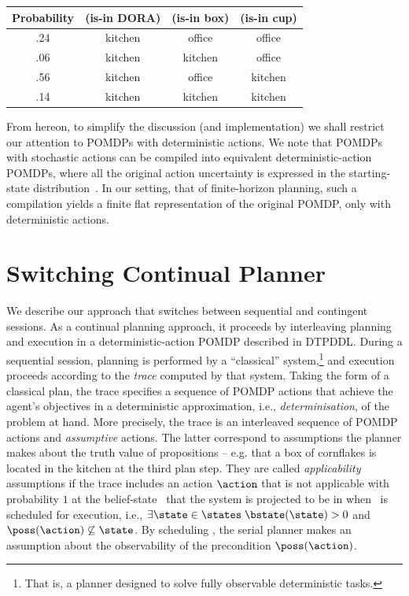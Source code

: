 \documentclass{article}
\begin{document}
\small
\begin{tabular}{cccc}
\hline
Probability & (is-in DORA)  & (is-in box)  & (is-in cup) \\
\hline
.24 & kitchen & office & office \\
.06 & kitchen & kitchen & office \\
.56 & kitchen & office & kitchen \\
.14 & kitchen & kitchen & kitchen \\
\hline
\end{tabular}
\normalsize

From hereon, to simplify the discussion (and implementation)
we shall restrict our attention to POMDPs with deterministic
actions. We note that POMDPs with stochastic
actions can be compiled into equivalent deterministic-action POMDPs,
where all the original action uncertainty is expressed in the
starting-state distribution~\cite{ng:Jordan:2000}. In our setting,
that of finite-horizon planning, such a compilation yields a finite
flat representation of the original POMDP, only with deterministic
actions.



\section{Switching Continual Planner}


We describe our approach that switches between sequential and
contingent sessions. As a continual planning approach, it proceeds by
interleaving planning and execution in a deterministic-action POMDP
described in DTPDDL. During a sequential session, planning is
performed by a ``classical'' system,\footnote{That is, a planner
designed to solve fully observable deterministic tasks.}  and
execution proceeds according to the {\em trace} computed by that
system. Taking the form of a classical plan, the trace specifies a
sequence of POMDP actions that achieve the agent's objectives in a
deterministic approximation, i.e., {\em determinisation}, of the
problem at hand. More precisely, the trace is an interleaved sequence
of POMDP actions and {\em assumptive} actions. The latter correspond
to assumptions the planner makes about the truth value of propositions
-- e.g. that a box of cornflakes is located in the kitchen at the
third plan step. They are called {\em applicability} assumptions if
the trace includes an action $\action$ that is not applicable with
probability $1$ at the belief-state
\bstate\ that the system is projected to be in when \action\ is
scheduled for execution, i.e., $\exists\state\in\states\;
\bstate(\state) > 0$ and $\poss(\action)\not\subseteq\state$. By
scheduling
\action,  the serial planner makes an assumption about the
observability of the precondition $\poss(\action)$.
\end{document}
